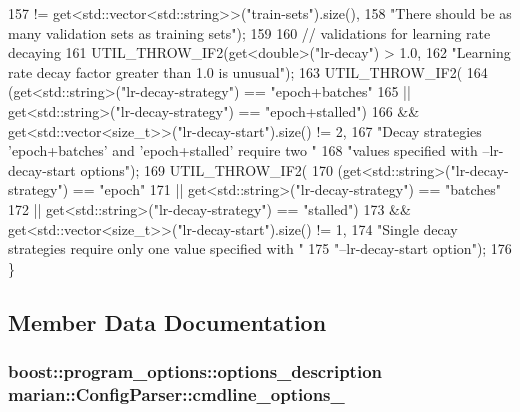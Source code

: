 \begin{DoxyCode}
157                  != \textcolor{keyword}{get}<std::vector<std::string>>(\textcolor{stringliteral}{"train-sets"}).size(),
158       \textcolor{stringliteral}{"There should be as many validation sets as training sets"});
159 
160   \textcolor{comment}{// validations for learning rate decaying}
161   UTIL\_THROW\_IF2(get<double>(\textcolor{stringliteral}{"lr-decay"}) > 1.0,
162                  \textcolor{stringliteral}{"Learning rate decay factor greater than 1.0 is unusual"});
163   UTIL\_THROW\_IF2(
164       (get<std::string>(\textcolor{stringliteral}{"lr-decay-strategy"}) == \textcolor{stringliteral}{"epoch+batches"}
165        || get<std::string>(\textcolor{stringliteral}{"lr-decay-strategy"}) == \textcolor{stringliteral}{"epoch+stalled"})
166           && \textcolor{keyword}{get}<std::vector<size\_t>>(\textcolor{stringliteral}{"lr-decay-start"}).size() != 2,
167       \textcolor{stringliteral}{"Decay strategies 'epoch+batches' and 'epoch+stalled' require two "}
168       \textcolor{stringliteral}{"values specified with --lr-decay-start options"});
169   UTIL\_THROW\_IF2(
170       (get<std::string>(\textcolor{stringliteral}{"lr-decay-strategy"}) == \textcolor{stringliteral}{"epoch"}
171        || get<std::string>(\textcolor{stringliteral}{"lr-decay-strategy"}) == \textcolor{stringliteral}{"batches"}
172        || get<std::string>(\textcolor{stringliteral}{"lr-decay-strategy"}) == \textcolor{stringliteral}{"stalled"})
173           && \textcolor{keyword}{get}<std::vector<size\_t>>(\textcolor{stringliteral}{"lr-decay-start"}).size() != 1,
174       \textcolor{stringliteral}{"Single decay strategies require only one value specified with "}
175       \textcolor{stringliteral}{"--lr-decay-start option"});
176 \}
\end{DoxyCode}


\subsection{Member Data Documentation}
\subsubsection[{\texorpdfstring{cmdline\+\_\+options\+\_\+}{cmdline_options_}}]{\setlength{\rightskip}{0pt plus 5cm}boost\+::program\+\_\+options\+::options\+\_\+description marian\+::\+Config\+Parser\+::cmdline\+\_\+options\+\_\+\hspace{0.3cm}{\ttfamily [private]}}\hypertarget{classmarian_1_1ConfigParser_af57fa6f4fb82e1e5b6068e7dcb56b3b2}{}\label{classmarian_1_1ConfigParser_af57fa6f4fb82e1e5b6068e7dcb56b3b2}


